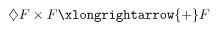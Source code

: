 \documentclass[preview]{standalone}
\begin{document}
\begin{align*}
\diamondsuit F \times F \xlongrightarrow{+}   F
\end{align*}
\end{document}

